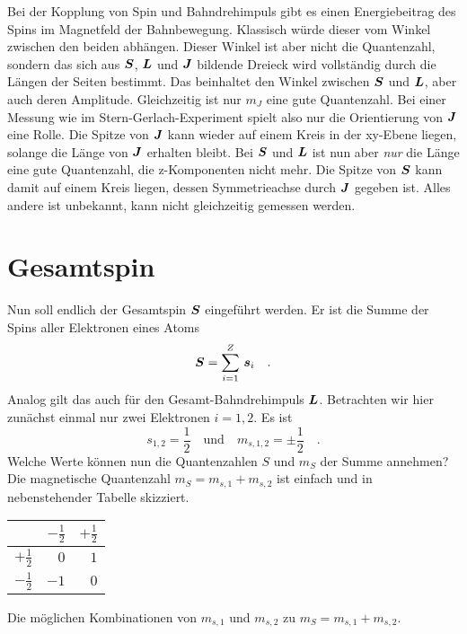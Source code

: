 Bei der Kopplung von Spin und Bahndrehimpuls gibt es einen Energiebeitrag des Spins im Magnetfeld der Bahnbewegung. Klassisch würde dieser vom Winkel zwischen den beiden abhängen. Dieser Winkel ist aber nicht die Quantenzahl, sondern das sich aus $\boldsymbol{S}$, $\boldsymbol{L}$ und $\boldsymbol{J}$ bildende Dreieck wird vollständig durch die Längen der Seiten bestimmt. Das beinhaltet den Winkel zwischen $\boldsymbol{S}$ und $\boldsymbol{L}$, aber auch deren Amplitude. Gleichzeitig ist nur $m_J$ eine gute Quantenzahl. Bei einer Messung wie im Stern-Gerlach-Experiment spielt also nur die Orientierung von $\boldsymbol{J}$ eine Rolle. Die Spitze von $\boldsymbol{J}$ kann wieder auf einem Kreis in der xy-Ebene liegen, solange die Länge von $\boldsymbol{J}$ erhalten bleibt. Bei $\boldsymbol{S}$ und $\boldsymbol{L}$ ist nun aber \emph{nur} die Länge eine gute Quantenzahl, die z-Komponenten nicht mehr. Die Spitze von $\boldsymbol{S}$ kann damit auf einem Kreis liegen, dessen Symmetrieachse durch $\boldsymbol{J}$ gegeben ist. Alles andere ist unbekannt, kann nicht gleichzeitig gemessen werden. %





\section{Gesamtspin}

Nun soll endlich der Gesamtspin $\boldsymbol{S}$ eingeführt werden. Er ist die Summe der Spins aller Elektronen eines Atoms
\begin{equation}
    \boldsymbol{S} = \sum_{i=1}^Z \, \boldsymbol{s}_i \quad . \label{eq:6_S_sum}
\end{equation}
Analog gilt das auch für den Gesamt-Bahndrehimpuls $\boldsymbol{L}$. Betrachten wir hier zunächst einmal nur zwei Elektronen $i =1, 2$. Es ist 
\begin{equation}
s_{1,2} = \frac{1}{2} \quad \text{und} \quad m_{s,1,2} = \pm \frac{1}{2}  \quad .
\end{equation}
Welche Werte können nun die Quantenzahlen  $S$ und $m_S$ der Summe annehmen? Die magnetische Quantenzahl $m_S  = m_{s,1} + m_{s,2}$ ist einfach und in nebenstehender Tabelle skizziert.
%
\begin{marginfigure}
\begin{tabular}{r|rr}
                           & $-\frac{1}{2} $  & $+\frac{1}{2} $ \\
                           \hline
 $+\frac{1}{2} $    &     $0$              & $1$ \\
 $-\frac{1}{2} $    &     $-1$              & $0$ 
\end{tabular}
\vspace*{2mm}
\caption{Die möglichen Kombinationen von $m_{s,1}$ und $m_{s,2}$ zu $m_S  = m_{s,1} + m_{s,2}$.}
\end{marginfigure}

